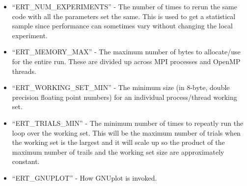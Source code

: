 \begin{itemize}

\vspace{-0.1in}
\item{``ERT\_\+NUM\_\+EXPERIMENTS'' - The number of times to rerun the same code
with all the parameters set the same.  This is used to get a statistical
sample since performance can sometimes vary without changing the local
experiment.}

\vspace{-0.1in}
\item{``ERT\_\+MEMORY\_\+MAX'' - The maximum number of bytes to allocate/use for
the entire run.  These are divided up across MPI processes and OpenMP
threads.}

\vspace{-0.1in}
\item{``ERT\_\+WORKING\_\+SET\_\+MIN'' - The minimum size (in 8-byte, double
precision floating point numbers) for an individual process/thread working
set.}

\vspace{-0.1in}
\item{``ERT\_\+TRIALS\_\+MIN'' - The minimum number of times to repeatly run
the loop over the working set.  This will be the maximum number of trials when
the working set is the largest and it will scale up so the product of the
maximum number of trails and the working set size are approximately constant.}

\vspace{-0.1in}
\item{``ERT\_\+GNUPLOT'' - How GNUplot is invoked.}

\end{itemize}
